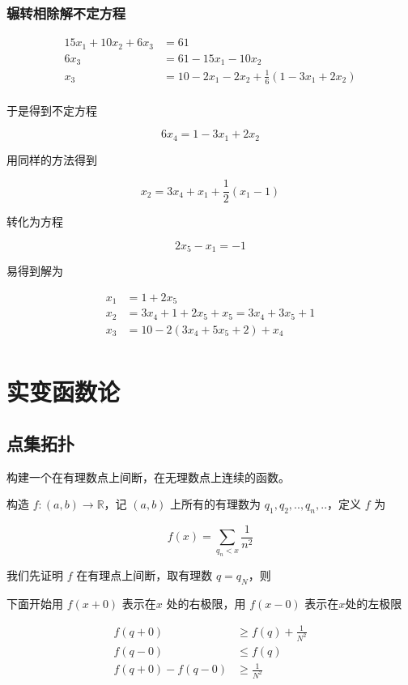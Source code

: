 \documentclass[12pt,a4paper]{ctexart}
\begin{document}
\subsubsection{辗转相除解不定方程}

\begin{align*}
    15x_1 + 10x_2 + 6x_3 &= 61 \\
    6x_3 &= 61 - 15x_1 -10x_2 \\
    x_3 &= 10 - 2x_1 -2x_2 + \frac{1}{6}\left(1 - 3x_1 + 2x_2\right) \\
\end{align*}

于是得到不定方程

\[
6x_4 = 1 - 3x_1 + 2x_2
\]

用同样的方法得到

\[
x_2 = 3x_4 + x_1 + \frac{1}{2}\left(x_1-1\right)
\]

转化为方程

\[
2x_5 - x_1 = -1
\]

易得到解为

\begin{align*}
    x_1 &= 1 + 2x_5  \\
    x_2 &= 3x_4 + 1 + 2x_5 + x_5 = 3x_4 + 3x_5 + 1 \\
    x_3 &= 10 -2(3x_4 + 5x_5 + 2) + x_4 \\
\end{align*}

\section{实变函数论}

\subsection{点集拓扑}

构建一个在有理数点上间断，在无理数点上连续的函数。

构造 $f: (a,b) \to \mathbb{R}$，记 $(a,b)$ 上所有的有理数为 $q_1,q_2,..,q_n,..$，定义 $f$ 为

\[
f(x) = \sum_{q_n < x} \frac{1}{n^2}
\]

我们先证明 $f$ 在有理点上间断，取有理数 $q = q_N$，则

下面开始用 $f(x+0)$ 表示在$x$ 处的右极限，用 $f(x-0)$ 表示在$x$处的左极限

\begin{align*}
f(q + 0) &\ge f(q) + \frac{1}{N^2}  \\
f(q - 0) & \le f(q) \\
f(q+0) - f(q-0) &\ge \frac{1}{N^2}
\end{align*}
\end{document}
